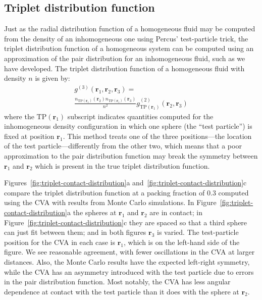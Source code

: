 \documentclass[letterpaper,twocolumn,amsmath,amssymb,pre,aps,10pt]{revtex4-1}
\newcommand{\rr}{\textbf{r}}
\begin{document}
\subsection{Triplet distribution function}

Just as the radial distribution function of a homogeneous fluid may be
computed from the density of an inhomogeneous one using Percus'
test-particle trick, the triplet distribution function of a
homogeneous system can be computed using an approximation of the pair
distribution for an inhomogeneous fluid, such as we have
developed. The triplet distribution function of a homogeneous fluid
with density $n$ is given by:
\begin{multline}
    g^{(3)}(\rr_1,\rr_2,\rr_3) =\\
    \frac{n_{\textrm{TP}(\rr_1)}(\rr_2)
      n_{\textrm{TP}(\rr_1)}(\rr_3)}{n^2}
    g^{(2)}_{\textrm{TP}(\rr_1)}(\rr_2,\rr_3)
\end{multline}
where the $\textrm{TP}(\rr_1)$ subscript indicates quantities computed for
the inhomogeneous density configuration in which one sphere (the
``test particle'') is fixed
at position $\rr_1$.  This method treats one of the three
positions---the location of the test particle---differently from the
other two, which means that a poor approximation to the pair distribution
function may break the symmetry between $\rr_1$ and $\rr_2$ which is
present in the true triplet distribution function.

Figures~\ref{fig:triplet-contact-distribution}a
and~\ref{fig:triplet-contact-distribution}c compare the triplet
distribution function at a packing fraction of 0.3 computed using the
CVA with results from Monte Carlo simulations. In
Figure~\ref{fig:triplet-contact-distribution}a the spheres at $\rr_1$
and $\rr_2$ are in contact; in
Figure~\ref{fig:triplet-contact-distribution}c they are spaced so that
a third sphere can just fit between them; and in both figures $\rr_3$
is varied. The test-particle position for the CVA in each case is
$\rr_1$, which is on the left-hand side of the figure. We see
reasonable agreement, with fewer oscillations in the CVA at larger
distances. Also, the Monte Carlo results have the expected left-right
symmetry, while the CVA has an asymmetry introduced with the test
particle due to errors in the pair distribution function. Most
notably, the CVA has less angular dependence at contact with the
test particle than it does with the sphere at $\rr_2$.
\end{document}
